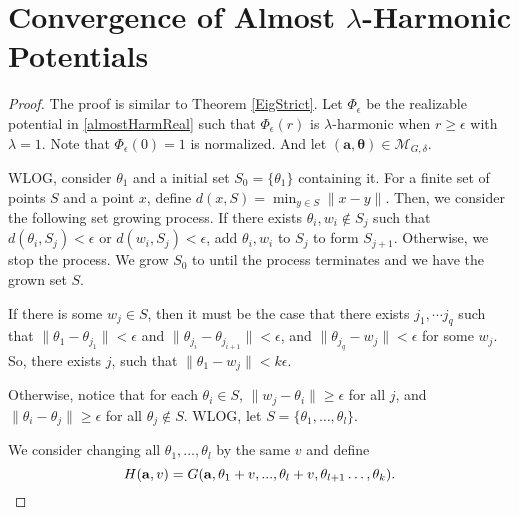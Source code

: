 

\section{Convergence of Almost $\lambda$-Harmonic Potentials}\label{App:EigenFunc}

\AlmostHarmConv*

\begin{proof}
 The proof is similar to Theorem \ref{EigStrict}. Let $\Phi_\epsilon$ be the realizable potential in \ref{almostHarmReal} such that $\Phi_\epsilon(r)$ is $\lambda$-harmonic when $r \geq \epsilon$ with $\lambda = 1$. Note that $\Phi_\epsilon(0) = 1$ is normalized. And let $\boldsymbol{(a,\theta)} \in \mathcal{M}_{G,\delta}$. 
 
WLOG, consider $\theta_1$ and a initial set $S_0 = \{ \theta_1\}$ containing it. For a finite set of points $S$ and a point $x$, define $d(x,S) = \min_{y \in S} \| x - y\|$. Then, we consider the following set growing process. If there exists $\theta_i, w_i \not \in S_j$ such that $d(\theta_i, S_j) < \epsilon$ or $d(w_i, S_j) < \epsilon$, add $\theta_i, w_i$ to $S_j$ to form $S_{j+1}$. Otherwise, we stop the process. We grow $S_0$ to until the process terminates and we have the grown set $S$.

If there is some $w_j \in S$, then it must be the case that there exists ${j_1},\cdots {j_q}$ such that $\|\theta_1 - \theta_{j_1} \| < \epsilon$ and
$\|\theta_{j_{i}} - \theta_{j_{i+1}}\| < \epsilon$, and
$\|\theta_{j_q}- w_j\| <\epsilon$ for some $w_j$. So, there exists $j$, such that $\|\theta_1 - w_j\| < k\epsilon$. 

Otherwise, notice that for each $\theta_i \in S$, $\|w_j - \theta_i\|\geq \epsilon$ for all $j$, and $\|\theta_i - \theta_j\| \geq \epsilon$ for all $\theta_j\not \in S$. WLOG, let $S = \{\theta_1,\dots,\theta_l\}$. 
  
We consider changing all
$\theta_1, \ldots, \theta_{l}$ by the same $v$ and define 
%
\[H({\bf a}, v) = G({\bf a},\theta_1+v,...,\theta_l+v, \theta_{l+1}
\ldots, \theta_k).\]


\end{proof}

